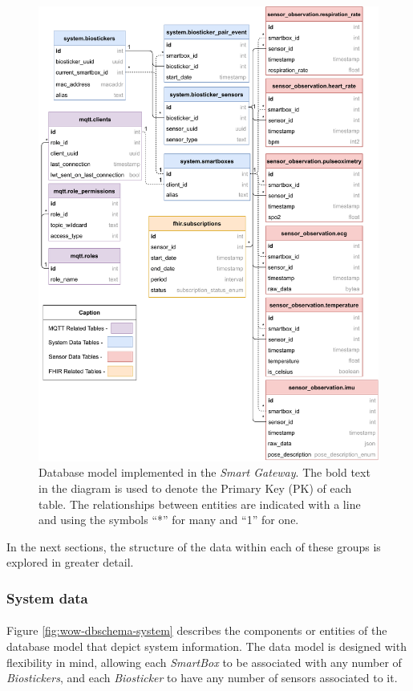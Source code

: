 \begin{figure}[H]
    \centering
    \includegraphics[width=0.9\linewidth]{images/database-schema-general.pdf}
    \caption[Database model implemented in the \textit{Smart Gateway}.]{Database model implemented in the \textit{Smart Gateway}. The bold text in the diagram is used to denote the Primary Key (PK) of each table. The relationships between entities are indicated with a line and using the symbols ``*'' for many and ``1'' for one.}
    \label{fig:wow-dbschema-full}
\end{figure}

In the next sections, the structure of the data within each of these groups is explored in greater detail.

\subsubsection{System data}
\paragraph{} Figure \ref{fig:wow-dbschema-system} describes the components or entities of the database model that depict system information. The data model is designed with flexibility in mind, allowing each \textit{SmartBox} to be associated with any number of \textit{Biostickers}, and each \textit{Biosticker} to have any number of sensors associated to it. 

